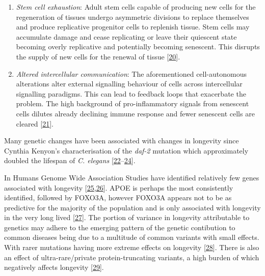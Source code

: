 \documentclass[
]{book}
\begin{document}
\begin{enumerate}
\def\labelenumi{\arabic{enumi}.}
\setcounter{enumi}{7}
\item
  \emph{Stem cell exhaustion}:
  Adult stem cells capable of producing new cells for the regeneration of tissues undergo asymmetric divisions to replace themselves and produce replicative progenitor cells to replenish tissue.
  Stem cells may accumulate damage and cease replicating or leave their quiescent state becoming overly replicative and potentially becoming senescent.
  This disrupts the supply of new cells for the renewal of tissue {[}\protect\hyperlink{ref-Ren2017}{20}{]}.
\item
  \emph{Altered intercellular communication}:
  The aforementioned cell-autonomous alterations alter external signalling behaviour of cells across intercellular signalling paradigms.
  This can lead to feedback loops that exacerbate the problem. The high background of pro-inflammatory signals from senescent cells dilutes already declining immune response and fewer senescent cells are cleared {[}\protect\hyperlink{ref-Franceschi2014}{21}{]}.
\end{enumerate}

Many genetic changes have been associated with changes in longevity since Cynthia Kenyon's characterisation of the \emph{daf-2} mutation which approximately doubled the lifespan of \emph{C. elegans} {[}\protect\hyperlink{ref-Kenyon1993a}{22}--\protect\hyperlink{ref-Singh2019}{24}{]}.

In Humans Genome Wide Association Studies have identified relatively few genes associated with longevity {[}\protect\hyperlink{ref-Broer2015}{25},\protect\hyperlink{ref-Zenin2019}{26}{]}.
APOE is perhaps the most consistently identified, followed by FOXO3A, however FOXO3A appears not to be as predictive for the majority of the population and is only associated with longevity in the very long lived {[}\protect\hyperlink{ref-Melzer2019}{27}{]}.
The portion of variance in longevity attributable to genetics may adhere to the emerging pattern of the genetic contibution to common diseases being due to a multitude of common variants with small effects.
With rarer mutations having more extreme effects on longevity {[}\protect\hyperlink{ref-Claussnitzer2020}{28}{]}.
There is also an effect of ultra-rare/private protein-truncating variants, a high burden of which negatively affects longevity {[}\protect\hyperlink{ref-Shindyapina2020}{29}{]}.
\end{document}

